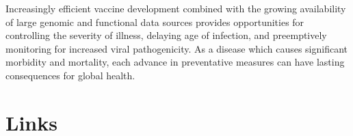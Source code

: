 \documentclass{article}
\begin{document}
Increasingly efficient vaccine development combined with the growing availability of large genomic and functional data sources provides opportunities for controlling the severity of illness, delaying age of infection, and preemptively monitoring for increased viral pathogenicity. 
As a disease which causes significant morbidity and mortality, each advance in preventative measures can have lasting consequences for global health.





\section{Links}
\end{document}
